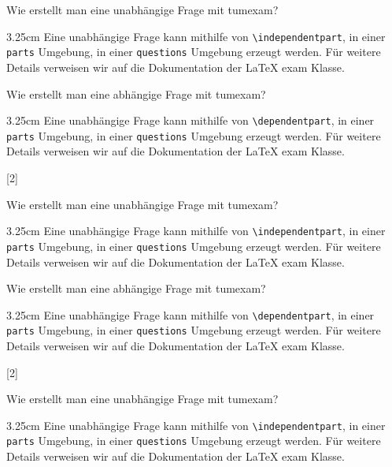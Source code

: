 \documentclass[german, @CLASSOPTIONS@]{tumexam}
\begin{document}
\begin{questions}
\begin{parts}
    \independentpart
    Wie erstellt man eine unabhängige Frage mit tumexam?
    \begin{solutionbox}{3.25cm}
      Eine unabhängige Frage kann mithilfe von \texttt{\textbackslash{independentpart}}, in einer \texttt{parts} Umgebung, in einer \texttt{questions} Umgebung erzeugt werden. Für weitere Details verweisen wir auf die Dokumentation der \LaTeX{} exam Klasse.
    \end{solutionbox}
    \dependentpart
    Wie erstellt man eine abhängige Frage mit tumexam?
    \begin{solutionbox}{3.25cm}
      Eine unabhängige Frage kann mithilfe von \texttt{\textbackslash{dependentpart}}, in einer \texttt{parts} Umgebung, in einer \texttt{questions} Umgebung erzeugt werden. Für weitere Details verweisen wir auf die Dokumentation der \LaTeX{} exam Klasse.
    \end{solutionbox}
  \end{parts}
  \clearpage
  [2]
  \begin{parts}
    \independentpart
    Wie erstellt man eine unabhängige Frage mit tumexam?
    \begin{solutionbox}{3.25cm}
      Eine unabhängige Frage kann mithilfe von \texttt{\textbackslash{independentpart}}, in einer \texttt{parts} Umgebung, in einer \texttt{questions} Umgebung erzeugt werden. Für weitere Details verweisen wir auf die Dokumentation der \LaTeX{} exam Klasse.
    \end{solutionbox}
    \dependentpart
    Wie erstellt man eine abhängige Frage mit tumexam?
    \begin{solutionbox}{3.25cm}
      Eine unabhängige Frage kann mithilfe von \texttt{\textbackslash{dependentpart}}, in einer \texttt{parts} Umgebung, in einer \texttt{questions} Umgebung erzeugt werden. Für weitere Details verweisen wir auf die Dokumentation der \LaTeX{} exam Klasse.
    \end{solutionbox}
  \end{parts}
  \clearpage
  [2]
  \begin{parts}
    \independentpart
    Wie erstellt man eine unabhängige Frage mit tumexam?
    \begin{solutionbox}{3.25cm}
      Eine unabhängige Frage kann mithilfe von \texttt{\textbackslash{independentpart}}, in einer \texttt{parts} Umgebung, in einer \texttt{questions} Umgebung erzeugt werden. Für weitere Details verweisen wir auf die Dokumentation der \LaTeX{} exam Klasse.

\end{solutionbox}
\end{parts}
\end{questions}
\end{document}
